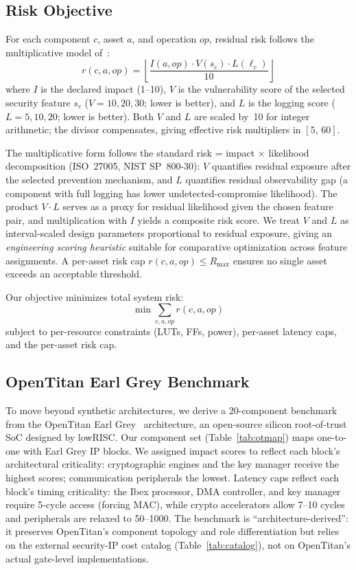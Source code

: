 \documentclass[conference]{IEEEtran}
\begin{document}
\subsection{Risk Objective}

For each component $c$, asset $a$, and operation $op$, residual risk
follows the multiplicative model of~\cite{butka_measuring_2025}:
\begin{equation}
r(c,a,op)=\left\lfloor \frac{I(a,op)\cdot V(s_c)\cdot L(\ell_c)}{10}\right\rfloor
\label{eq:risk}
\end{equation}
where $I$ is the declared impact (1--10), $V$ is the vulnerability score
of the selected security feature $s_c$ ($V\!=\!10,20,30$; lower is
better), and $L$ is the logging score ($L\!=\!5,10,20$; lower is
better). Both $V$ and $L$ are scaled by~10 for integer arithmetic;
the divisor compensates, giving effective risk multipliers in
$[5,\,60]$.

The multiplicative form follows the standard risk = impact $\times$
likelihood decomposition (ISO~27005, NIST SP~800-30): $V$ quantifies
residual exposure after the selected prevention mechanism, and $L$
quantifies residual observability gap (a component with full logging has
lower undetected-compromise likelihood). The product $V \cdot L$
serves as a proxy for residual likelihood given the chosen feature pair, and
multiplication with $I$ yields a composite risk score. We treat
$V$ and $L$ as interval-scaled design parameters proportional to
residual exposure, giving an \emph{engineering scoring heuristic}
suitable for comparative optimization across feature assignments.
A per-asset risk cap $r(c,a,op) \leq R_{\max}$ ensures no single
asset exceeds an acceptable threshold.

Our objective minimizes total system risk:
\begin{equation}
\min \sum_{c,a,op} r(c,a,op)
\end{equation}
subject to per-resource constraints (LUTs, FFs, power),
per-asset latency caps, and the per-asset risk cap.

\subsection{OpenTitan Earl Grey Benchmark}

To move beyond synthetic architectures, we derive a 20-component
benchmark from the OpenTitan Earl Grey~\cite{opentitan_repo}
architecture, an open-source silicon root-of-trust SoC designed by
lowRISC. Our component set (Table~\ref{tab:otmap}) maps one-to-one
with Earl Grey IP blocks. We assigned impact scores to reflect each
block's architectural criticality: cryptographic engines and the key
manager receive the highest scores; communication peripherals the
lowest.
Latency caps reflect each block's timing criticality: the Ibex
processor, DMA controller, and key manager require 5-cycle access
(forcing MAC), while crypto accelerators allow 7--10 cycles and
peripherals are relaxed to 50--1000.
The benchmark is
``architecture-derived'': it preserves OpenTitan's component
topology and role differentiation but relies on the external
security-IP cost catalog (Table~\ref{tab:catalog}), not on OpenTitan's
actual gate-level implementations.
\end{document}
